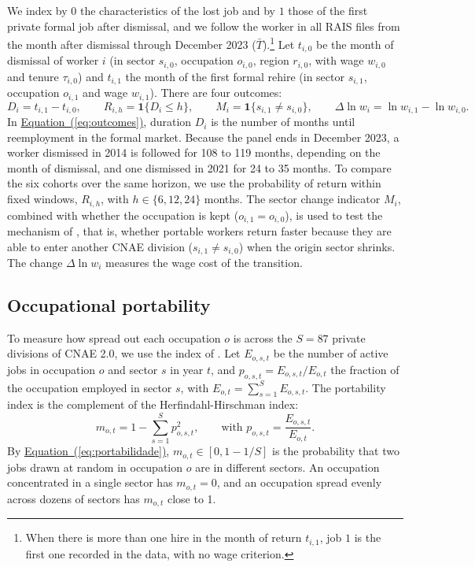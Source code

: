 \documentclass[11pt,a4paper]{article}
\let\citetorig\citet
\renewcommand{\citet}[1]{{\color{citeblue}\citetorig{#1}}}
\begin{document}
We index by $0$ the characteristics of the lost job and by $1$ those of the first private formal job after dismissal, and we follow the worker in all RAIS files from the month after dismissal through December 2023 ($\bar{T}$).\footnote{When there is more than one hire in the month of return $t_{i,1}$, job $1$ is the first one recorded in the data, with no wage criterion.} Let $t_{i,0}$ be the month of dismissal of worker $i$ (in sector $s_{i,0}$, occupation $o_{i,0}$, region $r_{i,0}$, with wage $w_{i,0}$ and tenure $\tau_{i,0}$) and $t_{i,1}$ the month of the first formal rehire (in sector $s_{i,1}$, occupation $o_{i,1}$ and wage $w_{i,1}$). There are four outcomes:
\begin{equation}
D_i = t_{i,1} - t_{i,0}, \qquad R_{i,h} = \mathbf{1}\big\{D_i \le h\big\}, \qquad M_i = \mathbf{1}\big\{s_{i,1} \neq s_{i,0}\big\}, \qquad \Delta \ln w_i = \ln w_{i,1} - \ln w_{i,0}.
\label{eq:outcomes}
\end{equation}
In \hyperref[eq:outcomes]{Equation~(\ref*{eq:outcomes})}, duration $D_i$ is the number of months until reemployment in the formal market. Because the panel ends in December 2023, a worker dismissed in 2014 is followed for 108 to 119 months, depending on the month of dismissal, and one dismissed in 2021 for 24 to 35 months. To compare the six cohorts over the same horizon, we use the probability of return within fixed windows, $R_{i,h}$, with $h \in \{6, 12, 24\}$ months. The sector change indicator $M_i$, combined with whether the occupation is kept ($o_{i,1} = o_{i,0}$), is used to test the mechanism of \citet{darougheh2024}, that is, whether portable workers return faster because they are able to enter another CNAE division ($s_{i,1} \neq s_{i,0}$) when the origin sector shrinks. The change $\Delta \ln w_i$ measures the wage cost of the transition.

\subsection{Occupational portability}
\label{sec:indice}

To measure how spread out each occupation $o$ is across the $S = 87$ private divisions of CNAE 2.0, we use the index of \citet{darougheh2022, darougheh2024}. Let $E_{o,s,t}$ be the number of active jobs in occupation $o$ and sector $s$ in year $t$, and $p_{o,s,t} = E_{o,s,t}/E_{o,t}$ the fraction of the occupation employed in sector $s$, with $E_{o,t} = \sum_{s=1}^S E_{o,s,t}$. The portability index is the complement of the Herfindahl-Hirschman index:
\begin{equation}
m_{o,t} = 1 - \sum_{s=1}^{S} p_{o,s,t}^2, \qquad \text{with } p_{o,s,t} = \frac{E_{o,s,t}}{E_{o,t}}.
\label{eq:portabilidade}
\end{equation}
By \hyperref[eq:portabilidade]{Equation~(\ref*{eq:portabilidade})}, $m_{o,t} \in [0, 1 - 1/S]$ is the probability that two jobs drawn at random in occupation $o$ are in different sectors. An occupation concentrated in a single sector has $m_{o,t} = 0$, and an occupation spread evenly across dozens of sectors has $m_{o,t}$ close to 1.
\end{document}
